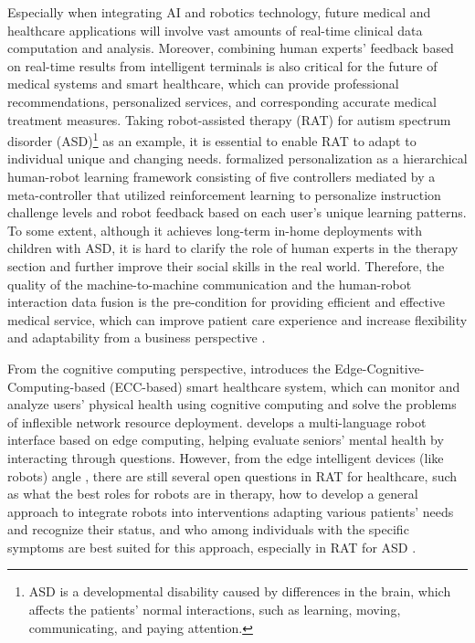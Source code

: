\documentclass[letterpaper]{article} %
\begin{document}
Especially when integrating AI and robotics technology, future medical and healthcare applications will involve vast amounts of real-time clinical data computation and analysis. Moreover, combining human experts' feedback based on real-time results from intelligent terminals is also critical for the future of medical systems and smart healthcare, which can provide professional recommendations, personalized services, and corresponding accurate medical treatment measures. Taking robot-assisted therapy (RAT) for autism spectrum disorder (ASD)\footnote{ASD is a developmental disability caused by differences in the brain, which affects the patients' normal interactions, such as learning, moving, communicating, and paying attention.} as an example, it is essential to enable RAT to adapt to individual unique and changing needs.
\cite{clabaugh2019long} formalized personalization as a hierarchical human-robot learning framework consisting of five controllers mediated by a meta-controller that utilized reinforcement learning to personalize instruction challenge levels and robot feedback based on each user’s unique learning patterns. To some extent, although it achieves long-term in-home deployments with children with ASD, it is hard to clarify the role of human experts in the therapy section and further improve their social skills in the real world.
Therefore, the quality of the machine-to-machine communication and the human-robot interaction data fusion is the pre-condition for providing efficient and effective medical service, which can improve patient care experience and increase flexibility and adaptability from a business perspective \cite{wan2020cognitive}.

From the cognitive computing perspective, \cite{chen2018edge} introduces the Edge-Cognitive-Computing-based (ECC-based) smart healthcare system, which can monitor and analyze users' physical health using cognitive computing and solve the problems of inflexible network resource deployment. \cite{yvanoff2020edge} develops a multi-language robot interface based on edge computing, helping evaluate seniors' mental health by interacting through questions. However, from the edge intelligent devices (like robots) angle \cite{groshev2023edge}, there are still several open questions in RAT for healthcare, such as what the best roles for robots are in therapy, how to develop a general approach to integrate robots into interventions adapting various patients' needs and recognize their status, and who among individuals with the specific symptoms are best suited for this approach, especially in RAT for ASD \cite{diehl2012clinical}.
\end{document}
